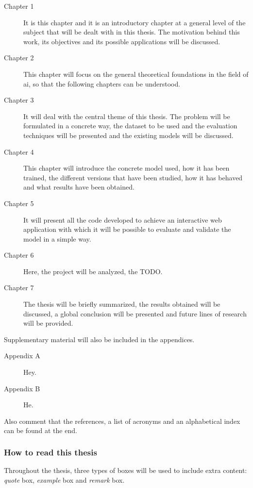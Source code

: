 \begin{description}
  \item [Chapter 1] It is this chapter and it is an introductory chapter at a
  general level of the subject that will be dealt with in this thesis. The
  motivation behind this work, its objectives and its possible applications
  will be discussed. 
  \item [Chapter 2] This chapter will focus on the general theoretical
  foundations in the field of \gls{ai}, so that the following chapters can be
  understood. 
  \item [Chapter 3] It will deal with the central theme of this thesis. The
  problem will be formulated in a concrete way, the dataset to be used and the
  evaluation techniques will be presented and the existing models will be
  discussed. 
  \item [Chapter 4] This chapter will introduce the concrete model used, how it
  has been trained, the different versions that have been studied, how it has
  behaved and what results have been obtained. 
  \item [Chapter 5] It will present all the code developed to achieve an
  interactive web application with which it will be possible to evaluate and
  validate the model in a simple way. 
  \item [Chapter 6] Here, the project will be analyzed, the
  TODO. 
  \item [Chapter 7] The thesis will be briefly summarized, the results obtained
  will be discussed, a global conclusion will be presented and future lines of
  research will be provided. 
\end{description}

Supplementary material will also be included in the appendices.

\begin{description}
  \item [Appendix A] Hey. 
  \item [Appendix B] He. 
\end{description}

Also comment that the references, a list of acronyms and an alphabetical index
can be found at the end.

\subsubsection{How to read this thesis}
Throughout the thesis, three types of boxes will be used to include extra
content: \emph{quote} box, \emph{example} box and \emph{remark} box.

